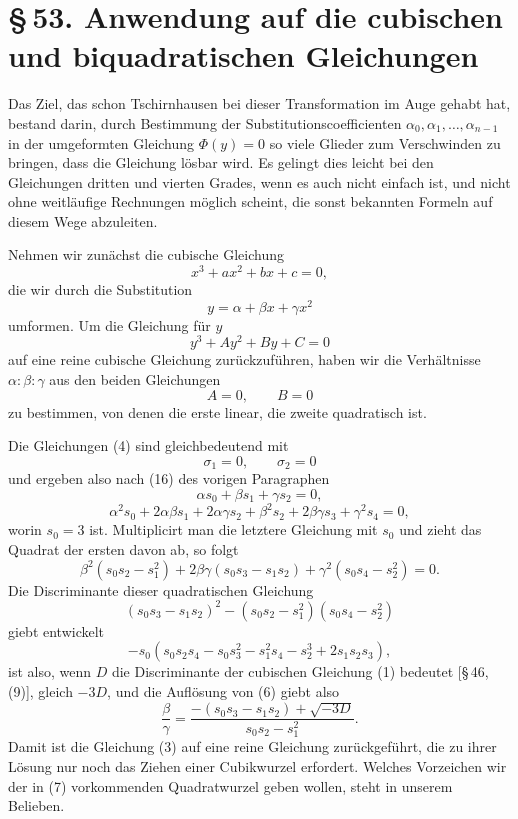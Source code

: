 \documentclass[11pt]{article}
\providecommand{\sect}[2]{\section*{\S\,#1. #2}}
\begin{document}
\sect{53}{Anwendung auf die cubischen und biquadratischen Gleichungen}

Das Ziel, das schon Tschirnhausen bei dieser Transformation im Auge gehabt hat, bestand darin, durch Bestimmung der Substitutionscoefficienten $\alpha_0,\alpha_1,\ldots,\alpha_{n-1}$ in der umgeformten Gleichung $\Phi(y)=0$ so viele Glieder zum Verschwinden zu bringen, dass die Gleichung lösbar wird. Es gelingt dies leicht bei den Gleichungen dritten und vierten Grades, wenn es auch nicht einfach ist, und nicht ohne weitläufige Rechnungen möglich scheint, die sonst bekannten Formeln auf diesem Wege abzuleiten.

Nehmen wir zunächst die cubische Gleichung
\begin{equation}
x^3+ax^2+bx+c=0,
\tag{1}
\end{equation}
die wir durch die Substitution
\begin{equation}
y=\alpha+\beta x+\gamma x^2
\tag{2}
\end{equation}
umformen. Um die Gleichung für $y$
\begin{equation}
y^3+Ay^2+By+C=0
\tag{3}
\end{equation}
auf eine reine cubische Gleichung zurückzuführen, haben wir die Verhältnisse $\alpha:\beta:\gamma$ aus den beiden Gleichungen
\begin{equation}
A=0,
\qquad
B=0
\tag{4}
\end{equation}
zu bestimmen, von denen die erste linear, die zweite quadratisch ist.

Die Gleichungen (4) sind gleichbedeutend mit
\begin{equation}
\sigma_1=0,
\qquad
\sigma_2=0
\tag{5}
\end{equation}
und ergeben also nach (16) des vorigen Paragraphen
\[
\alpha s_0+\beta s_1+\gamma s_2=0,
\]
\[
\alpha^2s_0+2\alpha\beta s_1+2\alpha\gamma s_2+\beta^2s_2+2\beta\gamma s_3+\gamma^2s_4=0,
\]
worin $s_0=3$ ist. Multiplicirt man die letztere Gleichung mit $s_0$ und zieht das Quadrat der ersten davon ab, so folgt
\begin{equation}
\beta^2(s_0s_2-s_1^2)+2\beta\gamma(s_0s_3-s_1s_2)+\gamma^2(s_0s_4-s_2^2)=0.
\tag{6}
\end{equation}
Die Discriminante dieser quadratischen Gleichung
\[
(s_0s_3-s_1s_2)^2-(s_0s_2-s_1^2)(s_0s_4-s_2^2)
\]
giebt entwickelt
\[
-s_0(s_0s_2s_4-s_0s_3^2-s_1^2s_4-s_2^3+2s_1s_2s_3),
\]
ist also, wenn $D$ die Discriminante der cubischen Gleichung (1) bedeutet [\S\,46, (9)], gleich $-3D$, und die Auflösung von (6) giebt also
\begin{equation}
\frac{\beta}{\gamma}=\frac{-(s_0s_3-s_1s_2)+\sqrt{-3D}}{s_0s_2-s_1^2}.
\tag{7}
\end{equation}
Damit ist die Gleichung (3) auf eine reine Gleichung zurückgeführt, die zu ihrer Lösung nur noch das Ziehen einer Cubikwurzel erfordert. Welches Vorzeichen wir der in (7) vorkommenden Quadratwurzel geben wollen, steht in unserem Belieben.
\end{document}
